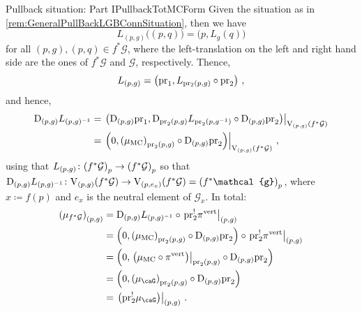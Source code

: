 \documentclass[reqno,a4paper,oneside]{amsart}
\newcommand\mutot{\mu_\caG}
\newcommand\MC{\mu_{{\rm MC}}}
\theoremstyle{plain}
\theoremstyle{remark}
\theoremstyle{definition}
\begin{document}
\begin{remarks}{Pullback situation: Part I}{PullbackTotMCForm}
Given the situation as in \ref{rem:GeneralPullBackLGBConnSituation}, then we have
\begin{equation*}
L_{(p, g)}\bigl( (p, q) \bigr)
=
\bigl(p, L_g(q)\bigr)
\end{equation*}
for all $(p, g), (p, q) \in f^*\mathcal{G}$, where the left-translation on the left and right hand side are the ones of $f^*\mathcal{G}$ and $\mathcal{G}$, respectively. Thence,
\begin{equation*}
L_{(p, g)}
=
\mleft(
	\mathrm{pr}_1, L_{\mathrm{pr_2}(p, g)} \circ \mathrm{pr}_2
\mright)~,
\end{equation*}
and hence,
\begin{align*}
\mathrm{D}_{(p, g)} L_{(p, g)^{-1}}
&=
\mleft.
\mleft(
	\mathrm{D}_{(p,g)}\mathrm{pr}_1, \mathrm{D}_{\mathrm{pr}_2(p, g)}L_{\mathrm{pr}_2\mleft(p, g^{-1}\mright)} \circ \mathrm{D}_{(p,g)}\mathrm{pr}_2
\mright)
\mright|_{\mathrm{V}_{(p, g)}\mleft( f^*\mathcal{G} \mright)}
\\
&=
\mleft.
\mleft(
	0, 
	\mleft( \MC \mright)_{\mathrm{pr}_2(p, g)} \circ \mathrm{D}_{(p,g)}\mathrm{pr}_2
\mright)\mright|_{\mathrm{V}_{(p, g)}\mleft( f^*\mathcal{G} \mright)}~,
\end{align*}
using that 
$L_{(p, g)}\colon \mleft(f^*\mathcal{G}\mright)_p \to \mleft(f^*\mathcal{G}\mright)_p$ so that $\mathrm{D}_{(p, g)}L_{(p, g)^{-1}}\colon\mathrm{V}_{(p, g)}\mleft( f^*\mathcal{G} \mright) \to \mathrm{V}_{(p, e_x)}\mleft( f^*\mathcal{G} \mright) = \mleft(f^*\mathcal{g}\mright)_{p}$, where $x \coloneqq f(p)$ and $e_x$ is the neutral element of $\mathcal{G}_x$.
In total:
\begin{align*}
\mleft(\mu_{f^*\mathcal{G}}\mright)_{(p, g)}
&=
\mathrm{D}_{(p, g)} L_{(p, g)^{-1}} \circ \mleft.\mathrm{pr}_2^!\pi^{\mathrm{vert}}\mright|_{(p, g)}
\\
&=
\mleft(
	0, 
	\mleft( \MC \mright)_{\mathrm{pr}_2(p, g)} \circ \mathrm{D}_{(p,g)}\mathrm{pr}_2
\mright)
	\circ \mleft.\mathrm{pr}_2^!\pi^{\mathrm{vert}}\mright|_{(p, g)}
\\
&=
\mleft(
	0, 
	\mleft.\mleft( \MC \circ \pi^{\mathrm{vert}}\mright)\mright|_{\mathrm{pr}_2(p, g)} \circ \mathrm{D}_{(p,g)}\mathrm{pr}_2
\mright)
\\
&=
\mleft(
	0, 
	\mleft( \mutot\mright)_{\mathrm{pr}_2(p, g)} \circ \mathrm{D}_{(p,g)}\mathrm{pr}_2
\mright)
\\
&=
\mleft.\mleft(\mathrm{pr}_2^!\mutot\mright)\mright|_{(p, g)}~.
\end{align*}
\end{remarks}
\end{document}
